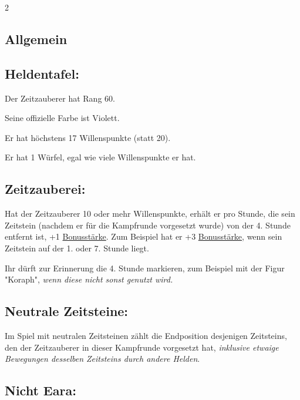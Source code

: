 \documentclass[10pt, a4paper, oneside]{book}
\newcommand{\fan}[1]{\textit{#1}}
\begin{document}
\begin{multicols*}{2}\raggedcolumns



\begin{nobgcolor}

\section{Allgemein}


\subsection{Heldentafel:}

Der Zeitzauberer hat Rang 60.

Seine offizielle Farbe ist Violett.

Er hat höchstens 17 Willenspunkte (statt 20).

Er hat 1 Würfel, egal wie viele Willenspunkte er hat.




\subsection{Zeitzauberei:}

Hat der Zeitzauberer 10 oder mehr Willenspunkte, erhält er pro Stunde, die sein Zeitstein (nachdem er für die Kampfrunde vorgesetzt wurde) von der 4. Stunde entfernt ist, +1 \hyperref[Bonusstärke]{Bonusstärke}. Zum Beispiel hat er +3 \hyperref[Bonusstärke]{Bonusstärke}, wenn sein Zeitstein auf der 1. oder 7. Stunde liegt.
\supercite{BL_RdSK:Kirr}


Ihr dürft zur Erinnerung die 4. Stunde markieren, zum Beispiel mit der Figur "Koraph", \fan{wenn diese nicht sonst genutzt wird.}




\subsection{Neutrale Zeitsteine:}

Im Spiel mit neutralen Zeitsteinen zählt die Endposition desjenigen Zeitsteins, den der Zeitzauberer in dieser Kampfrunde vorgesetzt hat, \fan{inklusive etwaige Bewegungen desselben Zeitsteins durch andere Helden}.




\subsection{Nicht Eara:}


\end{nobgcolor}
\end{multicols*}
\end{document}
